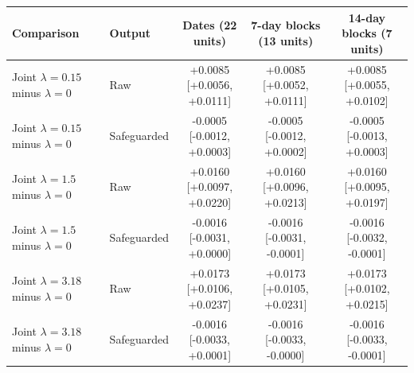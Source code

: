 \begin{tabular}{llccc}
\hline
Comparison & Output & Dates (22 units) & 7-day blocks (13 units) & 14-day blocks (7 units) \\
\hline
\shortstack[l]{Joint $\lambda=0.15$\\minus $\lambda=0$} & Raw & \shortstack{+0.0085\\{[+0.0056, +0.0111]}} & \shortstack{+0.0085\\{[+0.0052, +0.0111]}} & \shortstack{+0.0085\\{[+0.0055, +0.0102]}} \\
\shortstack[l]{Joint $\lambda=0.15$\\minus $\lambda=0$} & Safeguarded & \shortstack{-0.0005\\{[-0.0012, +0.0003]}} & \shortstack{-0.0005\\{[-0.0012, +0.0002]}} & \shortstack{-0.0005\\{[-0.0013, +0.0003]}} \\
\shortstack[l]{Joint $\lambda=1.5$\\minus $\lambda=0$} & Raw & \shortstack{+0.0160\\{[+0.0097, +0.0220]}} & \shortstack{+0.0160\\{[+0.0096, +0.0213]}} & \shortstack{+0.0160\\{[+0.0095, +0.0197]}} \\
\shortstack[l]{Joint $\lambda=1.5$\\minus $\lambda=0$} & Safeguarded & \shortstack{-0.0016\\{[-0.0031, +0.0000]}} & \shortstack{-0.0016\\{[-0.0031, -0.0001]}} & \shortstack{-0.0016\\{[-0.0032, -0.0001]}} \\
\shortstack[l]{Joint $\lambda=3.18$\\minus $\lambda=0$} & Raw & \shortstack{+0.0173\\{[+0.0106, +0.0237]}} & \shortstack{+0.0173\\{[+0.0105, +0.0231]}} & \shortstack{+0.0173\\{[+0.0102, +0.0215]}} \\
\shortstack[l]{Joint $\lambda=3.18$\\minus $\lambda=0$} & Safeguarded & \shortstack{-0.0016\\{[-0.0033, +0.0001]}} & \shortstack{-0.0016\\{[-0.0033, -0.0000]}} & \shortstack{-0.0016\\{[-0.0033, -0.0001]}} \\
\hline
\end{tabular}
